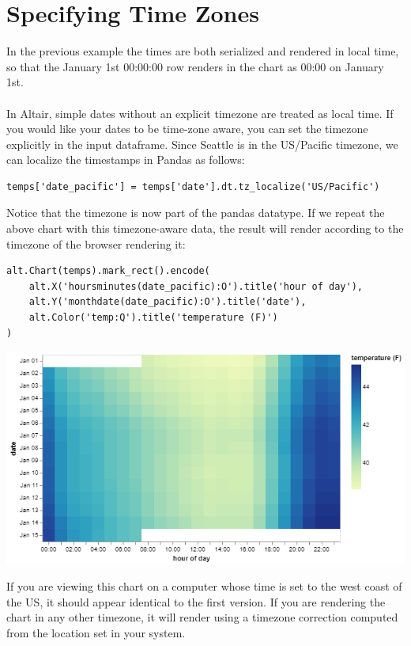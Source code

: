 \documentclass[11pt]{article}
\begin{document}
\section{Specifying Time Zones}

In the previous example the times are both serialized and rendered in local time, so that the January 1st 00:00:00 row renders in the chart as 00:00 on January 1st.\\
\\
In Altair, simple dates without an explicit timezone are treated as local time. If you would like your dates to be time-zone aware, you can set the timezone explicitly in the input dataframe. Since Seattle is in the US/Pacific timezone, we can localize the timestamps in Pandas as follows:

\begin{verbatim}
temps['date_pacific'] = temps['date'].dt.tz_localize('US/Pacific')
\end{verbatim}

Notice that the timezone is now part of the pandas datatype. If we repeat the above chart with this timezone-aware data, the result will render according to the timezone of the browser rendering it:

\begin{verbatim}
alt.Chart(temps).mark_rect().encode(
    alt.X('hoursminutes(date_pacific):O').title('hour of day'),
    alt.Y('monthdate(date_pacific):O').title('date'),
    alt.Color('temp:Q').title('temperature (F)')
)
\end{verbatim}

\begin{center}
\includegraphics[width=.7\textwidth]{visualization (5).png}
\end{center}

If you are viewing this chart on a computer whose time is set to the west coast of the US, it should appear identical to the first version. If you are rendering the chart in any other timezone, it will render using a timezone correction computed from the location set in your system.
\end{document}
